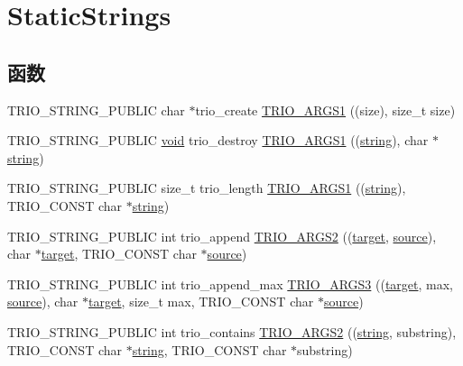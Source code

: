\hypertarget{group___static_strings}{}\section{Static\+Strings}
\label{group___static_strings}
\subsection*{函数}
\begin{DoxyCompactItemize}
\item 
T\+R\+I\+O\+\_\+\+S\+T\+R\+I\+N\+G\+\_\+\+P\+U\+B\+L\+IC char $\ast$trio\+\_\+create \hyperlink{group___static_strings_ga8ce1b8461e39195df0f8a0fac057c615}{T\+R\+I\+O\+\_\+\+A\+R\+G\+S1} ((size), size\+\_\+t size)
\item 
T\+R\+I\+O\+\_\+\+S\+T\+R\+I\+N\+G\+\_\+\+P\+U\+B\+L\+IC \hyperlink{interfacevoid}{void} trio\+\_\+destroy \hyperlink{group___static_strings_gad535775978ae53c5aed97b909d289542}{T\+R\+I\+O\+\_\+\+A\+R\+G\+S1} ((\hyperlink{structstring}{string}), char $\ast$\hyperlink{structstring}{string})
\item 
T\+R\+I\+O\+\_\+\+S\+T\+R\+I\+N\+G\+\_\+\+P\+U\+B\+L\+IC size\+\_\+t trio\+\_\+length \hyperlink{group___static_strings_ga5592dac03631de886d13a188bb8b7eff}{T\+R\+I\+O\+\_\+\+A\+R\+G\+S1} ((\hyperlink{structstring}{string}), T\+R\+I\+O\+\_\+\+C\+O\+N\+ST char $\ast$\hyperlink{structstring}{string})
\item 
T\+R\+I\+O\+\_\+\+S\+T\+R\+I\+N\+G\+\_\+\+P\+U\+B\+L\+IC int trio\+\_\+append \hyperlink{group___static_strings_gab7aa5ceeea8d810e95a8dd8f1a8c1b77}{T\+R\+I\+O\+\_\+\+A\+R\+G\+S2} ((\hyperlink{interfacevoid}{target}, \hyperlink{structsource}{source}), char $\ast$\hyperlink{interfacevoid}{target}, T\+R\+I\+O\+\_\+\+C\+O\+N\+ST char $\ast$\hyperlink{structsource}{source})
\item 
T\+R\+I\+O\+\_\+\+S\+T\+R\+I\+N\+G\+\_\+\+P\+U\+B\+L\+IC int trio\+\_\+append\+\_\+max \hyperlink{group___static_strings_ga4722252d0999591d557985866354906f}{T\+R\+I\+O\+\_\+\+A\+R\+G\+S3} ((\hyperlink{interfacevoid}{target}, max, \hyperlink{structsource}{source}), char $\ast$\hyperlink{interfacevoid}{target}, size\+\_\+t max, T\+R\+I\+O\+\_\+\+C\+O\+N\+ST char $\ast$\hyperlink{structsource}{source})
\item 
T\+R\+I\+O\+\_\+\+S\+T\+R\+I\+N\+G\+\_\+\+P\+U\+B\+L\+IC int trio\+\_\+contains \hyperlink{group___static_strings_ga6284f500a4a0ad10d0507a968b645c1d}{T\+R\+I\+O\+\_\+\+A\+R\+G\+S2} ((\hyperlink{structstring}{string}, substring), T\+R\+I\+O\+\_\+\+C\+O\+N\+ST char $\ast$\hyperlink{structstring}{string}, T\+R\+I\+O\+\_\+\+C\+O\+N\+ST char $\ast$substring)

\end{DoxyCompactItemize}
